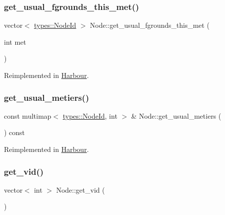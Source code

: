 \subsubsection{\texorpdfstring{get\_usual\_fgrounds\_this\_met()}{get\_usual\_fgrounds\_this\_met()}}
{\footnotesize\ttfamily vector$<$ \mbox{\hyperlink{classtypes_1_1_node_id}{types\+::\+Node\+Id}} $>$ Node\+::get\+\_\+usual\+\_\+fgrounds\+\_\+this\+\_\+met (\begin{DoxyParamCaption}\item[{int}]{met }\end{DoxyParamCaption})\hspace{0.3cm}{\ttfamily [virtual]}}



Reimplemented in \mbox{\hyperlink{class_harbour_a324bed1382950129e692eb3e4302d700}{Harbour}}.

\mbox{\label{class_node_aab0fed01a893726033107dd46ccadcb8}} 
\subsubsection{\texorpdfstring{get\_usual\_metiers()}{get\_usual\_metiers()}}
{\footnotesize\ttfamily const multimap$<$ \mbox{\hyperlink{classtypes_1_1_node_id}{types\+::\+Node\+Id}}, int $>$ \& Node\+::get\+\_\+usual\+\_\+metiers (\begin{DoxyParamCaption}{ }\end{DoxyParamCaption}) const\hspace{0.3cm}{\ttfamily [virtual]}}



Reimplemented in \mbox{\hyperlink{class_harbour_a4678c9c337d7253b47863ab3a252f3d4}{Harbour}}.

\mbox{\label{class_node_a24e980d4af18f208515d4b597362ddd7}} 
\subsubsection{\texorpdfstring{get\_vid()}{get\_vid()}}
{\footnotesize\ttfamily vector$<$ int $>$ Node\+::get\+\_\+vid (\begin{DoxyParamCaption}{ }\end{DoxyParamCaption})}

